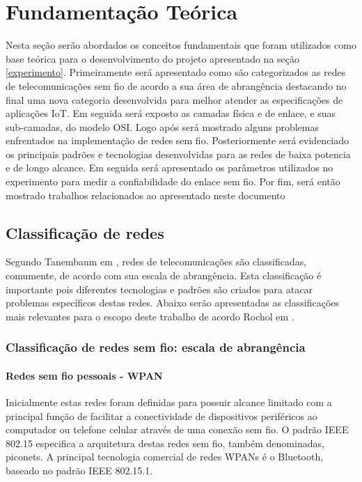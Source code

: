 \chapter{Fundamentação Teórica}
\label{fundamentacao}
Nesta seção serão abordados os conceitos fundamentais que foram utilizados como base teórica para o desenvolvimento do projeto apresentado na seção \ref{experimento}.
Primeiramente será apresentado como são categorizados as redes de telecomunicações sem fio de acordo a sua área de abrangência destacando no final uma nova categoria desenvolvida para melhor atender as especificações de aplicações IoT.
Em seguida será exposto as camadas física e de enlace, e suas sub-camadas, do modelo OSI.
Logo após será mostrado alguns problemas enfrentados na implementação de redes sem fio.
Posteriormente será evidenciado os principais padrões e tecnologias desenvolvidas para as redes de baixa potencia e de longo alcance.
Em seguida será apresentado os parâmetros utilizados no experimento para medir a confiabilidade do enlace sem fio.
Por fim, será então mostrado trabalhos relacionados ao apresentado neste documento

\section{Classificação de redes}
\label{classRedes}
Segundo Tanembaum em \cite{tanembaum2011}, redes de telecomunicações são classificadas, comumente, de acordo com sua escala de abrangência. Esta classificação é importante pois diferentes tecnologias e padrões são criados para atacar problemas específicos destas redes. Abaixo serão apresentadas as classificações mais relevantes para o escopo deste trabalho de acordo Rochol em \cite{rochol2018sistemas}.


\subsection{Classificação de redes sem fio: escala de abrangência}
\subsubsection*{Redes sem fio pessoais - WPAN}
Inicialmente estas redes foram definidas para possuir alcance limitado com a principal função de facilitar a conectividade de dispositivos periféricos ao computador ou telefone celular através de uma conexão sem fio. O padrão IEEE 802.15 especifica a arquitetura destas redes sem fio, também denominadas, piconets. A principal  tecnologia comercial de redes WPANs é o Bluetooth, baseado no padrão IEEE 802.15.1.

